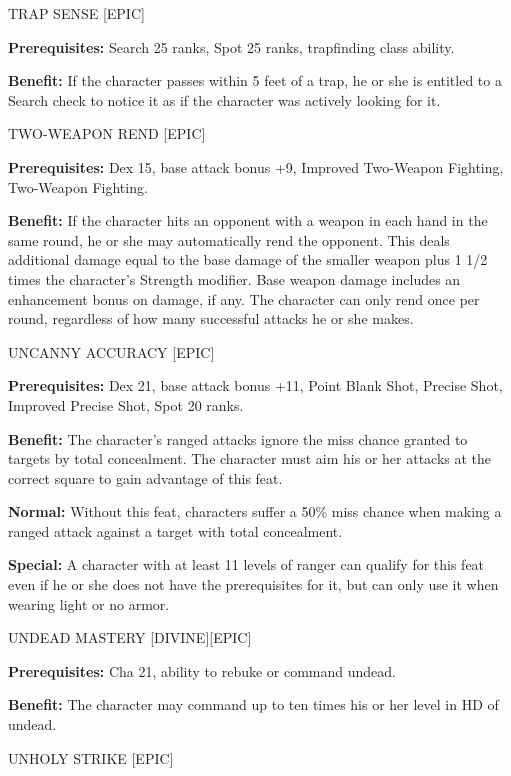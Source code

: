 \documentclass{article}
\begin{document}
\vspace{12pt}
TRAP SENSE [EPIC] 

\textbf{Prerequisites:} Search 25 ranks, Spot 25 ranks, trapfinding class ability. 

\textbf{Benefit:} If the character passes within 5 feet of a trap, he or she is 
entitled to a Search check to notice it as if the character was actively looking 
for it. 

\vspace{12pt}
TWO-WEAPON REND [EPIC] 

\textbf{Prerequisites:} Dex 15, base attack bonus +9, Improved Two-Weapon Fighting, 
Two-Weapon Fighting. 

\textbf{Benefit:} If the character hits an opponent with a weapon in each hand 
in the same round, he or she may automatically rend the opponent. This deals additional 
damage equal to the base damage of the smaller weapon plus 1 1/2 times the character's 
Strength modifier. Base weapon damage includes an enhancement bonus on damage, 
if any. The character can only rend once per round, regardless of how many successful 
attacks he or she makes. 

\vspace{12pt}
UNCANNY ACCURACY [EPIC]

\textbf{Prerequisites:} Dex 21, base attack bonus +11, Point Blank Shot, Precise 
Shot, Improved Precise Shot, Spot 20 ranks. 

\textbf{Benefit:} The character's ranged attacks ignore the miss chance granted 
to targets by total concealment.  The character must aim his or her attacks at 
the correct square to gain advantage of this feat. 

\textbf{Normal:} Without this feat, characters suffer a 50\% miss chance when making 
a ranged attack against a target with total concealment.

\textbf{Special:} A character with at least 11 levels of ranger can qualify for 
this feat even if he or she does not have the prerequisites for it, but can only 
use it when wearing light or no armor.

\vspace{12pt}
UNDEAD MASTERY [DIVINE][EPIC] 

\textbf{Prerequisites:} Cha 21, ability to rebuke or command undead. 

\textbf{Benefit:} The character may command up to ten times his or her level in 
HD of undead. 

\vspace{12pt}
UNHOLY STRIKE [EPIC] 
\end{document}
